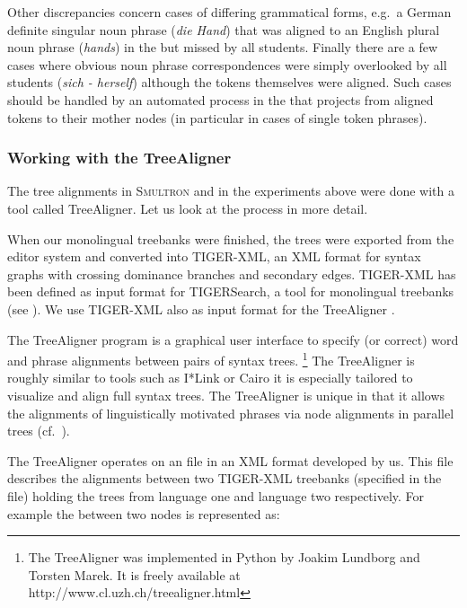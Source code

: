 \documentclass[output=paper]{LSP/langsci}
\begin{document}
Other discrepancies concern cases of differing grammatical forms, e.g.~a German definite singular noun phrase (\textit{die Hand}) that was aligned to an English plural noun phrase (\textit{hands}) in the  but missed by all students. Finally there are a few cases where obvious noun phrase correspondences were simply overlooked by all students (\textit{sich - herself}) although the tokens themselves were aligned. Such cases should be handled by an automated process in the  that projects from aligned tokens to their mother nodes (in particular in cases of single token phrases). 

\subsubsection{Working with the TreeAligner}\label{sec:volk:2.2.5}

The tree alignments in S\textsc{multron} and in the experiments above were done with a tool called TreeAligner. Let us look at the  process in more detail. 

When our monolingual treebanks were finished, the trees were exported from the editor system and converted into TIGER-XML, an XML format for  syntax graphs with crossing dominance branches and secondary edges. TIGER-XML has been defined as input format for TIGERSearch, a  tool for monolingual treebanks (see ). We use TIGER-XML also as input format for the TreeAligner \citep{VolkEtAl2006}. 

The TreeAligner program is a graphical user interface to specify (or correct) word and phrase alignments between pairs of syntax trees. \footnote{The TreeAligner was implemented in Python by Joakim Lundborg and Torsten Marek. It is freely available at http://www.cl.uzh.ch/treealigner.html} The TreeAligner is roughly similar to  tools such as I*Link \citep{AhrenbergEtAl2002} or Cairo \citeauthor{Smith2000} it is especially tailored to visualize and align full syntax trees. The TreeAligner is unique in that it allows the alignments of linguistically motivated phrases via node alignments in parallel  trees (cf.~\citealt{Samuelsson2007}). 

The TreeAligner operates on an  file in an XML format developed by us. This file describes the alignments between two TIGER-XML treebanks (specified in the  file) holding the trees from language one and language two respectively. For example the  between two nodes is represented as: 
\end{document}
